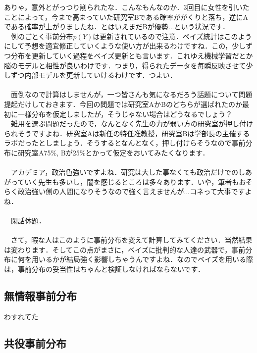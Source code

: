 \documentclass[11pt,a4paper]{jsarticle}                    %
\begin{document}
ありゃ，意外とがっつり削られたな．こんなもんなのか．3回目に女性を引いたことによって，今まで高まっていた研究室Bである確率ががくりと落ち，逆にAである確率が上がりましたね．とはいえまだBが優勢...という状況です．\\
　例のごとく事前分布$p(Y)$は更新されているので注意．ベイズ統計はこのようにして予想を適宜修正していくような使い方が出来るわけですね．この，少しずつ分布を更新していく過程をベイズ更新とも言います．これゆえ機械学習だとか脳のモデルと相性が良いわけです．つまり，得られたデータを毎瞬反映させて少しずつ内部モデルを更新していけるわけです．つよい．\\
\\
　面倒なので計算はしませんが，一つ皆さんも気になるだろう話題について問題提起だけしておきます．今回の問題では研究室AかBのどちらが選ばれたのか最初に一様分布を仮定しましたが，そうじゃない場合はどうなるでしょう？\\
　雑用を選ぶ問題だったので，なんとなく先生の力が弱い方の研究室が押し付けられそうですよね．研究室Aは新任の特任准教授，研究室Bは学部長の主催するラボだったとしましょう．そうするとなんとなく，押し付けらそうなので事前分布に研究室A75\%, Bが25\%とかって仮定をおいてみたくなります．\\
\\
　アカデミア，政治色強いですよね．研究は大した事なくても政治だけでのしあがっていく先生も多いし，闇を感じるところは多々あります．いや，筆者もおそらく政治強い側の人間になりそうなので強く言えませんが...コネって大事ですよね．\\
\\
　閑話休題．
\\
\\
　さて，暇な人はこのように事前分布を変えて計算してみてください．当然結果は変わります．そしてこの点がまさに，ベイズに批判的な人達の武器で，事前分布に何を用いるかが結局強く影響しちゃうんですよね．なのでベイズを用いる際は，事前分布の妥当性はちゃんと検証しなければならないです．











\subsection{無情報事前分布}





わすれてた

\subsection{共役事前分布}
\end{document}
